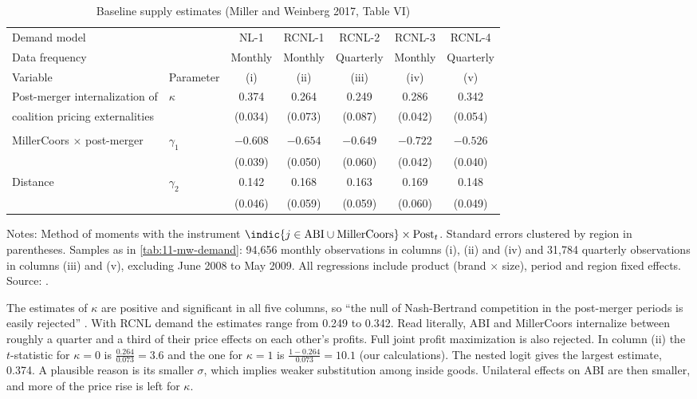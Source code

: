 \begin{table}[htbp]
\centering
\caption{Baseline supply estimates (Miller and Weinberg 2017, Table VI)}
\label{tab:11-mw-supply}
\footnotesize
\begin{tabular}{@{}llccccc@{}}
\toprule
Demand model & & NL-1 & RCNL-1 & RCNL-2 & RCNL-3 & RCNL-4 \\
Data frequency & & Monthly & Monthly & Quarterly & Monthly & Quarterly \\
Variable & Parameter & (i) & (ii) & (iii) & (iv) & (v) \\
\midrule
Post-merger internalization of & $\kappa$ & 0.374 & 0.264 & 0.249 & 0.286 & 0.342 \\
\quad coalition pricing externalities & & (0.034) & (0.073) & (0.087) & (0.042) & (0.054) \\
\addlinespace
\multicolumn{7}{@{}l}{\textit{Marginal cost parameters}} \\
MillerCoors $\times$ post-merger & $\gamma_1$ & $-0.608$ & $-0.654$ & $-0.649$ & $-0.722$ & $-0.526$ \\
 & & (0.039) & (0.050) & (0.060) & (0.042) & (0.040) \\
Distance & $\gamma_2$ & 0.142 & 0.168 & 0.163 & 0.169 & 0.148 \\
 & & (0.046) & (0.059) & (0.059) & (0.060) & (0.049) \\
\bottomrule
\end{tabular}

\smallskip
\begin{minipage}{0.97\linewidth}
\footnotesize Notes: Method of moments with the instrument $\indic\{j \in \text{ABI} \cup \text{MillerCoors}\}\times
\text{Post}_t$. Standard errors clustered by region in parentheses. Samples as in \cref{tab:11-mw-demand}: 94,656
monthly observations in columns (i), (ii) and (iv) and 31,784 quarterly observations in columns (iii) and (v),
excluding June 2008 to May 2009. All regressions include product (brand $\times$ size), period and region fixed
effects. Source: \citet[Table VI, p.~1781]{MillerWeinberg2017}.
\end{minipage}
\end{table}

The estimates of $\kappa$ are positive and significant in all five columns, so ``the null of Nash-Bertrand competition
in the post-merger periods is easily rejected'' \citep[p.~1781]{MillerWeinberg2017}. With RCNL demand the estimates
range from 0.249 to 0.342. Read literally, ABI and MillerCoors internalize between roughly a quarter and a third of
their price effects on each other's profits. Full joint profit maximization is also rejected. In column (ii) the
$t$-statistic for $\kappa = 0$ is $\frac{0.264}{0.073} = 3.6$ and the one for $\kappa = 1$ is $\frac{1 - 0.264}{0.073}
= 10.1$ (our calculations). The nested logit gives the largest estimate, 0.374. A plausible reason is its smaller $\sigma$, which implies
weaker substitution among inside goods. Unilateral effects on ABI are then smaller, and more of the price rise is left
for $\kappa$.

